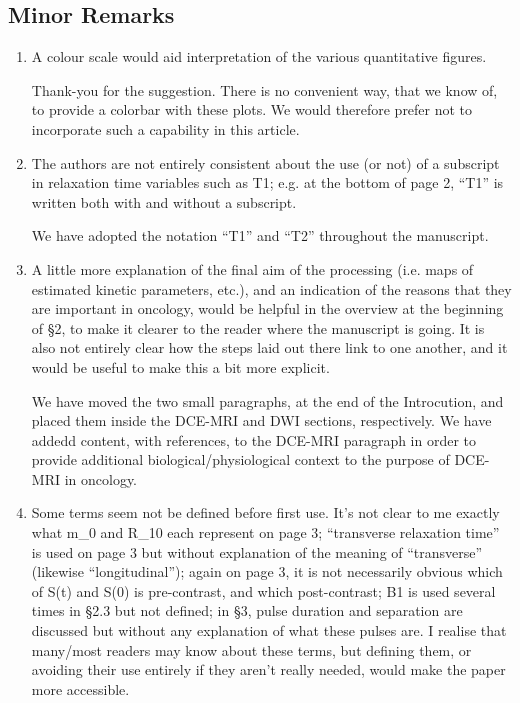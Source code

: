 \documentclass[11pt]{article}
\begin{document}
\subsection*{Minor Remarks}

\begin{enumerate}

\item A colour scale would aid interpretation of the various
  quantitative figures.

  Thank-you for the suggestion.  There is no convenient way, that we
  know of, to provide a colorbar with these plots.  We would therefore
  prefer not to incorporate such a capability in this article.

\item The authors are not entirely consistent about the use (or not)
  of a subscript in relaxation time variables such as T1; e.g. at the
  bottom of page 2, ``T1'' is written both with and without a
  subscript.

  We have adopted the notation ``T1'' and ``T2'' throughout the
  manuscript.

\item A little more explanation of the final aim of the processing
  (i.e.  maps of estimated kinetic parameters, etc.), and an
  indication of the reasons that they are important in oncology, would
  be helpful in the overview at the beginning of \S2, to make it
  clearer to the reader where the manuscript is going.  It is also not
  entirely clear how the steps laid out there link to one another, and
  it would be useful to make this a bit more explicit.

  We have moved the two small paragraphs, at the end of the
  Introcution, and placed them inside the DCE-MRI and DWI sections,
  respectively.  We have addedd content, with references, to the
  DCE-MRI paragraph in order to provide additional
  biological/physiological context to the purpose of DCE-MRI in
  oncology.

\item Some terms seem not be defined before first use.  It's not clear
  to me exactly what m\_0 and R\_10 each represent on page 3;
  ``transverse relaxation time'' is used on page 3 but without
  explanation of the meaning of ``transverse'' (likewise
  ``longitudinal''); again on page 3, it is not necessarily obvious
  which of S(t) and S(0) is pre-contrast, and which post-contrast; B1
  is used several times in \S2.3 but not defined; in \S3, pulse
  duration and separation are discussed but without any explanation of
  what these pulses are. I realise that many/most readers may know
  about these terms, but defining them, or avoiding their use entirely
  if they aren't really needed, would make the paper more accessible.


\end{enumerate}
\end{document}
